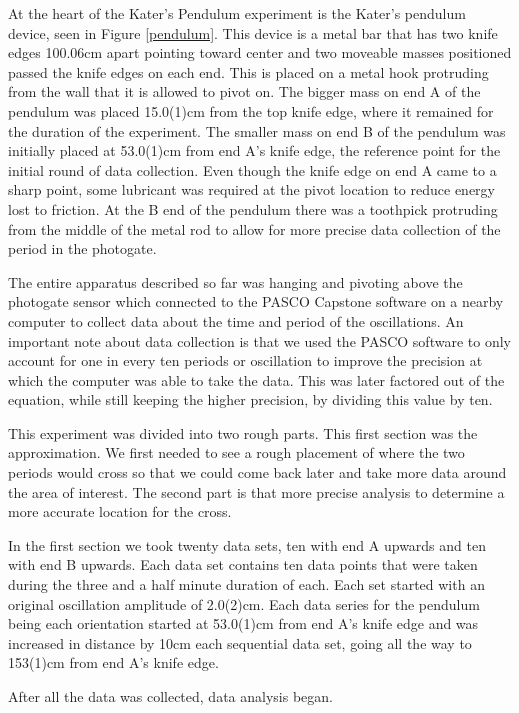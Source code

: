 \documentclass[aps,prl,10pt,twocolumn,floatfix]{revtex4-2}
\begin{document}
At the heart of the Kater's Pendulum experiment is the Kater's pendulum device, seen in Figure \ref{pendulum}. 
This device is a metal bar that has two knife edges 100.06cm apart pointing toward center and two moveable masses positioned passed the knife edges on each end. 
This is placed on a metal hook protruding from the wall that it is allowed to pivot on. 
The bigger mass on end A of the pendulum was placed 15.0(1)cm from the top knife edge, where it remained for the duration of the experiment. 
The smaller mass on end B of the pendulum was initially placed at 53.0(1)cm from end A's knife edge, the reference point for the initial round of data collection. 
Even though the knife edge on end A came to a sharp point, some lubricant was required at the pivot location to reduce energy lost to friction. 
At the B end of the pendulum there was a toothpick protruding from the middle of the metal rod to allow for more precise data collection of the period in the photogate. 

The entire apparatus described so far was hanging and pivoting above the photogate sensor which connected to the PASCO Capstone software on a nearby computer to collect data about the time and period of the oscillations. 
An important note about data collection is that we used the PASCO software to only account for one in every ten periods or oscillation to improve the precision at which the computer was able to take the data.
This was later factored out of the equation, while still keeping the higher precision, by dividing this value by ten. 

This experiment was divided into two rough parts. 
This first section was the approximation.
We first needed to see a rough placement of where the two periods would cross so that we could come back later and take more data around the area of interest.
The second part is that more precise analysis to determine a more accurate location for the cross.

In the first section we took twenty data sets, ten with end A upwards and ten with end B upwards. 
Each data set contains ten data points that were taken during the three and a half minute duration of each.
Each set started with an original oscillation amplitude of 2.0(2)cm.
Each data series for the pendulum being each orientation started at 53.0(1)cm from end A's knife edge and was increased in distance by 10cm each sequential data set, going all the way to 153(1)cm from end A's knife edge. 

After all the data was collected, data analysis began.
\end{document}
